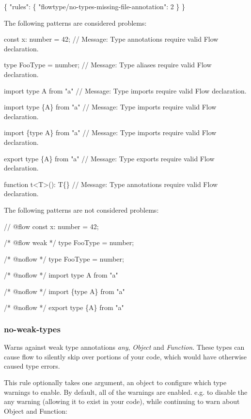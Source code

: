 \begin{DoxyCode}
\{
    "rules": \{
        "flowtype/no-types-missing-file-annotation": 2
    \}
\}
\end{DoxyCode}


The following patterns are considered problems\+:


\begin{DoxyCode}
const x: number = 42;
// Message: Type annotations require valid Flow declaration.

type FooType = number;
// Message: Type aliases require valid Flow declaration.

import type A from "a"
// Message: Type imports require valid Flow declaration.

import type \{A\} from "a"
// Message: Type imports require valid Flow declaration.

import \{type A\} from "a"
// Message: Type imports require valid Flow declaration.

export type \{A\} from "a"
// Message: Type exports require valid Flow declaration.

function t<T>(): T\{\}
// Message: Type annotations require valid Flow declaration.
\end{DoxyCode}


The following patterns are not considered problems\+:


\begin{DoxyCode}
// @flow
const x: number = 42;

/* @flow weak */
type FooType = number;

/* @noflow */
type FooType = number;

/* @noflow */
import type A from "a"

/* @noflow */
import \{type A\} from "a"

/* @noflow */
export type \{A\} from "a"
\end{DoxyCode}


\label{_eslint-plugin-flowtype-rules-no-weak-types}%
 \subsubsection*{{\ttfamily no-\/weak-\/types}}

Warns against weak type annotations {\itshape any}, {\itshape Object} and {\itshape Function}. These types can cause flow to silently skip over portions of your code, which would have otherwise caused type errors.

This rule optionally takes one argument, an object to configure which type warnings to enable. By default, all of the warnings are enabled. e.\+g. to disable the {\ttfamily any} warning (allowing it to exist in your code), while continuing to warn about {\ttfamily Object} and {\ttfamily Function}\+:


